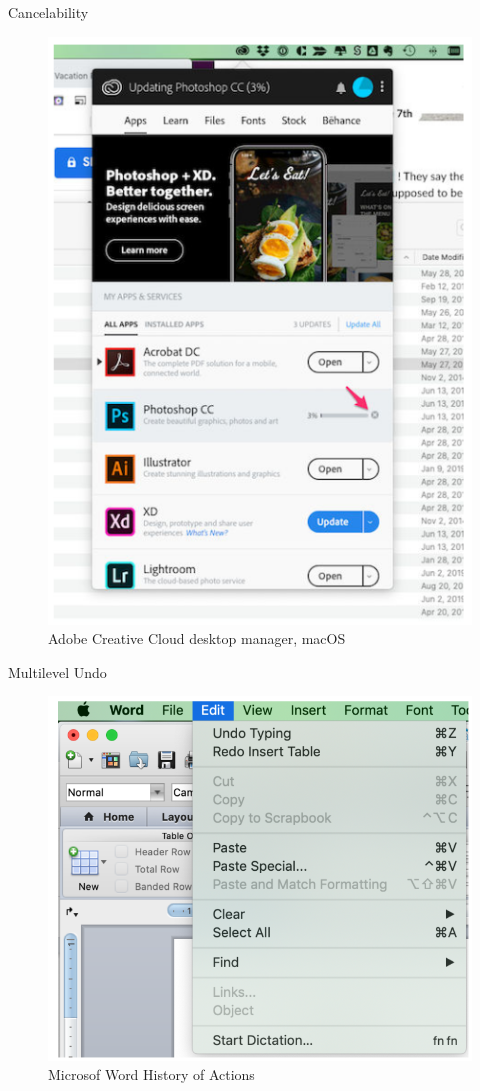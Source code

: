 \documentclass{beamer}
\begin{document}
\begin{frame}[t]{Cancelability}
	\begin{figure}[h]
		\centering
		\includegraphics[scale=0.6]{images/lec08-pic23.png}
		\caption{Adobe Creative Cloud desktop manager, macOS}
	\end{figure}
\end{frame}

\begin{frame}[t]{Multilevel Undo}
	\begin{figure}[h]
		\centering
		\includegraphics[scale=0.6]{images/lec08-pic24.png}
		\caption{Microsof Word History of Actions}
	\end{figure}
\end{frame}
\end{document}
